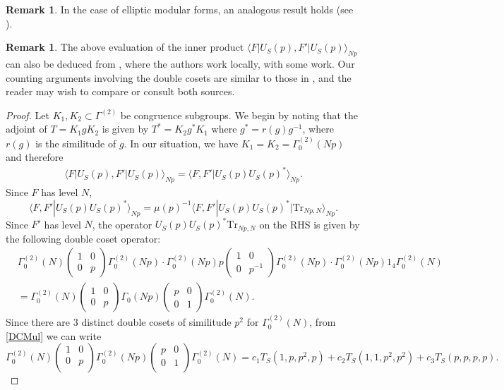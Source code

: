 \documentclass[11pt]{amsart}
\numberwithin{equation}{section}
\theoremstyle{plain}
\theoremstyle{definition}
\newtheorem{rmk}[thm]{Remark}
\newcommand{\mrm}{\mathrm}
\newcommand{\lan}{\langle }
\newcommand{\ran}{\rangle}
\newcommand{\smat}[4]{\left( \begin{smallmatrix}#1&#2\\#3&#4\end{smallmatrix}\right)}
\newcommand{\pmat}[4]{\begin{pmatrix} #1 & #2 \\ #3 & #4 \\ \end{pmatrix} }
\begin{document}
\begin{rmk}
    In the case of elliptic modular forms, an analogous result holds (see \cite[Theorem 8]{anamby2019distinguishing}).
\end{rmk}
\begin{rmk}
    The above evaluation of the inner product $\lan F|U_S(p), F'|U_S(p)\ran_{Np}$ can also be deduced from \cite{brown2017action}, where the authors work locally, with some work. Our counting arguments involving the double cosets are similar to those in \cite{brown2017action}, and the reader may wish to compare or consult both sources.
\end{rmk}
\begin{proof}
Let $K_1,K_2 \subset \Gamma^{(2)}$ be congruence subgroups.
We begin by noting that the adjoint of $T= K_1 g K_2$ is given by $T^*= K_2 g^* K_1$ where $g^*=r(g) g^{-1}$, where $r(g)$ is the similitude of $g$. In our situation, we have $K_1=K_2=\Gamma_0^{(2)}(Np)$  and therefore
\begin{align}
     \lan F|U_S(p), F'|U_S(p)\ran_{Np} = \lan F, F'|U_S(p) U_S(p)^* \ran_{Np}.
\end{align}
Since $F$ has level $N$, 
\begin{equation}
    \lan F, F'|U_S(p) U_S(p)^* \ran_{Np} = \mu(p)^{-1} \lan F, F'|U_S(p) U_S(p)^*| \mrm{Tr}_{Np,N} \ran_{Np}.
\end{equation}
Since $F'$ has level $N$, the operator $U_S(p) U_S(p)^* \mrm{Tr}_{Np,N}$ on the RHS is given by the following double coset operator:
\begin{align}
 &\Gamma^{(2)}_0(N)\smat{1}{0}{0}{p} \Gamma_0^{(2)}(Np) \cdot \Gamma_0^{(2)}(Np) p \smat{1}{0}{0}{p^{-1} }\Gamma_0^{(2)}(Np)\cdot \Gamma_0^{(2)}(Np) 1_4 \Gamma^{(2)}_0(N)\\
 &= \Gamma^{(2)}_0(N) \smat{1}{0}{0}{p} \Gamma_0(Np) \smat{p}{0}{0}{1} \Gamma^{(2)}_0(N).
\end{align}
Since there are $3$ distinct double cosets of similitude $p^2$ for $\Gamma^{(2)}_0(N)$, from \eqref{DCMul} we can write
\begin{equation} \label{UpUp*}
    \Gamma^{(2)}_0(N)\pmat{1}{0}{0}{p} \Gamma_0^{(2)}(Np) \pmat{p}{0}{0}{1} \Gamma^{(2)}_0(N)= c_1 T_S(1, p, p^2, p) +c_2 T_S(1,1,p^2,p^2)+c_3 T_S(p,p,p,p).
\end{equation}


\end{proof}
\end{document}
